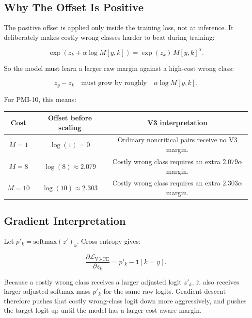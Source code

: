 \documentclass[11pt]{article}
\begin{document}
\subsection{Why The Offset Is Positive}

The positive offset is applied only inside the training loss, not at inference. It deliberately makes costly wrong classes harder to beat during training:

\begin{equation}
\exp(z_k + \alpha \log M[y,k])
=
\exp(z_k)\,M[y,k]^\alpha.
\end{equation}

So the model must learn a larger raw margin against a high-cost wrong class:

\begin{equation}
z_y - z_k
\quad\text{must grow by roughly}\quad
\alpha \log M[y,k].
\end{equation}

For PMI-10, this means:

\begin{center}
\begin{tabular}{ccc}
\toprule
Cost & Offset before scaling & V3 interpretation \\
\midrule
$M=1$ & $\log(1)=0$ & Ordinary noncritical pairs receive no V3 margin. \\
$M=8$ & $\log(8)\approx2.079$ & Costly wrong class requires an extra $2.079\alpha$ margin. \\
$M=10$ & $\log(10)\approx2.303$ & Costly wrong class requires an extra $2.303\alpha$ margin. \\
\bottomrule
\end{tabular}
\end{center}

\subsection{Gradient Interpretation}

Let $p'_k=\mathrm{softmax}(z')_k$. Cross entropy gives:

\begin{equation}
\frac{\partial \mathcal{L}_{\mathrm{V3\text{-}CE}}}{\partial z_k}
=
p'_k - \mathbf{1}[k=y].
\end{equation}

Because a costly wrong class receives a larger adjusted logit $z'_k$, it also receives larger adjusted softmax mass $p'_k$ for the same raw logits. Gradient descent therefore pushes that costly wrong-class logit down more aggressively, and pushes the target logit up until the model has a larger cost-aware margin.
\end{document}

